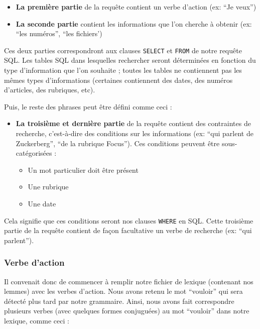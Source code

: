 \begin{itemize}
    \item \textbf{La première partie} de la requête contient un verbe d'action (ex: ``Je veux'')
    \item \textbf{La seconde partie} contient les informations que l'on cherche à obtenir (ex: ``les numéros'', ``les fichiers')
\end{itemize}

\sql
Ces deux parties correspondront aux clauses \lstinline{SELECT} et \lstinline{FROM} de notre requête SQL. Les tables SQL dans lesquelles rechercher seront déterminées en fonction du type d'information que l'on souhaite ; toutes les tables ne contiennent pas les mêmes types d'informations (certaines contiennent des dates, des numéros d'articles, des rubriques, etc).

\medskip

Puis, le reste des phrases peut être défini comme ceci :

\begin{itemize}
    \item \textbf{La troisième et dernière partie} de la requête contient des contraintes de recherche, c'est-à-dire des conditions sur les informations (ex: ``qui parlent de Zuckerberg'', ``de la rubrique Focus''). Ces conditions peuvent être sous-catégorisées :
    \begin{itemize}
        \item Un mot particulier doit être présent
        \item Une rubrique
        \item Une date
    \end{itemize}
\end{itemize}

Cela signifie que ces conditions seront nos clauses \lstinline{WHERE} en SQL. Cette troisième partie de la requête contient de façon facultative un verbe de recherche (ex: ``qui parlent'').

\subsubsection{Verbe d'action}\label{action}

Il convenait donc de commencer à remplir notre fichier de lexique (contenant nos lemmes) avec les verbes d'action. Nous avons retenu le mot ``vouloir'' qui sera détecté plus tard par notre grammaire. Ainsi, nous avons fait correspondre plusieurs verbes (avec quelques formes conjuguées) au mot ``vouloir'' dans notre lexique, comme ceci :


